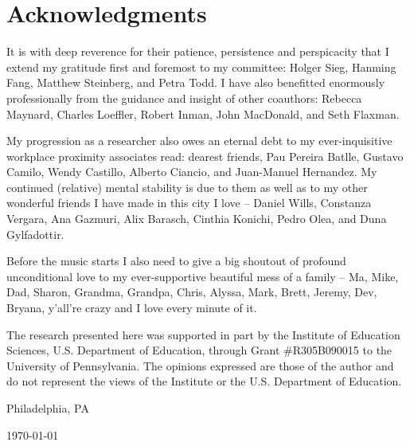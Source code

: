 \chapter*{Acknowledgments}

It is with deep reverence for their patience, persistence and perspicacity that I extend my gratitude first and foremost to my committee: Holger Sieg, Hanming Fang, Matthew Steinberg, and Petra Todd. I have also benefitted enormously professionally from the guidance and insight of other coauthors: Rebecca Maynard, Charles Loeffler, Robert Inman, John MacDonald, and Seth Flaxman.

My progression as a researcher also owes an eternal debt to my ever-inquisitive workplace proximity associates read: dearest friends, Pau Pereira Batlle, Gustavo Camilo, Wendy Castillo, Alberto Ciancio, and Juan-Manuel Hernandez. My continued (relative) mental stability is due to them as well as to my other wonderful friends I have made in this city I love -- Daniel Wills, Constanza Vergara, Ana Gazmuri, Alix Barasch, Cinthia Konichi, Pedro Olea, and Duna Gylfadottir.

Before the music starts I also need to give a big shoutout of profound unconditional love to my ever-supportive beautiful mess of a family -- Ma, Mike, Dad, Sharon, Grandma, Grandpa, Chris, Alyssa, Mark, Brett, Jeremy, Dev, Bryana, y'all're crazy and I love every minute of it.

The research presented here was supported in part by the Institute of Education Sciences, U.S. Department of Education, through Grant \#R305B090015 to the University of Pennsylvania. The opinions expressed are those of the author and do not represent the views of the Institute or the U.S. Department of Education.

\hfill \theauthor

\hfill Philadelphia, PA

\hfill \today
